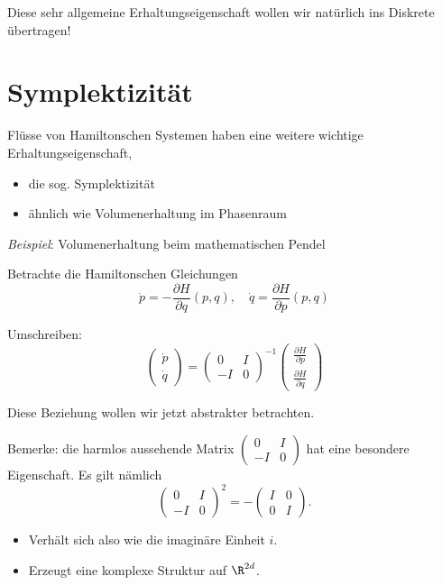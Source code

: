 Diese sehr allgemeine Erhaltungseigenschaft wollen wir natürlich ins Diskrete übertragen!

\section{Symplektizität}

Flüsse von Hamiltonschen Systemen haben eine weitere wichtige Erhaltungseigenschaft,
\begin{itemize}
\item die sog. Symplektizität
\item ähnlich wie Volumenerhaltung im Phasenraum
\end{itemize}

\emph{Beispiel}: Volumenerhaltung beim mathematischen Pendel

  \bigskip

Betrachte die Hamiltonschen Gleichungen
\begin{equation*}
  \dot p = - \frac{\partial H}{\partial q}(p, q),
  \quad
  \dot q = \frac{\partial H}{\partial p}(p, q)
\end{equation*}

Umschreiben:
\begin{equation*}
  \begin{pmatrix} \dot p \\ \dot q \end{pmatrix}
  =
  \begin{pmatrix} 0 & I \\ -I & 0 \end{pmatrix}^{-1}
  \begin{pmatrix} \frac{\partial H}{\partial p} \\ \frac{\partial H}{\partial q} \end{pmatrix}
\end{equation*}

Diese Beziehung wollen wir jetzt abstrakter betrachten.

Bemerke: die harmlos aussehende Matrix $\begin{pmatrix} 0 & I \\ -I & 0 \end{pmatrix}$ hat eine besondere Eigenschaft.
Es gilt nämlich
\begin{equation*}
  \begin{pmatrix} 0 & I \\ -I & 0 \end{pmatrix}^2
  = - \begin{pmatrix} I & 0 \\ 0 & I \end{pmatrix}.
\end{equation*}
\begin{itemize}
\item Verhält sich also wie die imaginäre Einheit $i$.
\item Erzeugt eine komplexe Struktur auf $\R^{2d}$.
\end{itemize}

